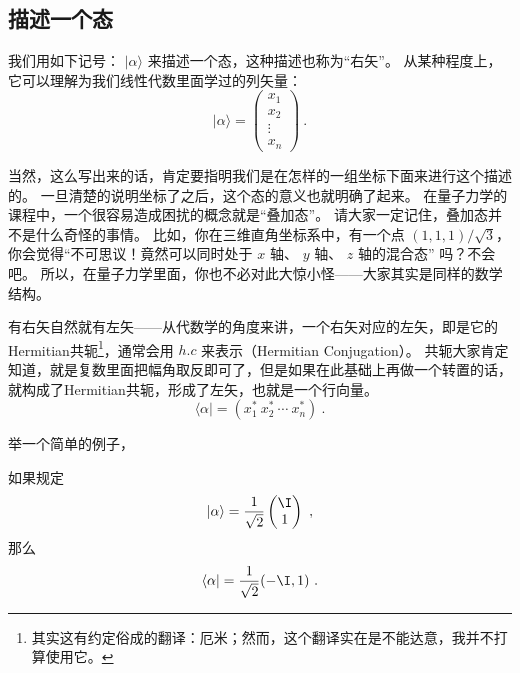 
\subsection{描述一个态}

我们用如下记号： $|\alpha\rangle$ 来描述一个态，这种描述也称为“右矢”。 从某种程度上，它可以理解为我们线性代数里面学过的列矢量：
\begin{equation}
|\alpha\rangle = \left(\begin{matrix}x_1\\x_2\\ \vdots\\ x_n\end{matrix}\right)~.
\end{equation}

当然，这么写出来的话，肯定要指明我们是在怎样的一组坐标下面来进行这个描述的。 一旦清楚的说明坐标了之后，这个态的意义也就明确了起来。 在量子力学的课程中，一个很容易造成困扰的概念就是“叠加态”。 请大家一定记住，叠加态并不是什么奇怪的事情。 比如，你在三维直角坐标系中，有一个点 $(1, 1, 1)/\sqrt3$，你会觉得“不可思议！竟然可以同时处于 $x$ 轴、 $y$ 轴、 $z$ 轴的混合态” 吗？不会吧。 所以，在量子力学里面，你也不必对此大惊小怪——大家其实是同样的数学结构。

有右矢自然就有左矢——从代数学的角度来讲，一个右矢对应的左矢，即是它的Hermitian共轭\footnote{其实这有约定俗成的翻译：厄米；然而，这个翻译实在是不能达意，我并不打算使用它。}，通常会用 $h. c$ 来表示（Hermitian Conjugation）。 共轭大家肯定知道，就是复数里面把幅角取反即可了，但是如果在此基础上再做一个转置的话，就构成了Hermitian共轭，形成了左矢，也就是一个行向量。
\begin{equation}
\langle\alpha| = (x_1^*\ x_2^*\ \cdots\ x_n^*)~.
\end{equation}

举一个简单的例子，

\begin{example}{}
如果规定
\begin{equation}
|\alpha\rangle = \frac{1}{\sqrt{2}}\left(\begin{matrix}\I \\1\end{matrix}\right) ~,
\end{equation}
那么
\begin{equation}
\langle\alpha| = \frac{1}{\sqrt{2}}(-\I, 1)~.
\end{equation}
\end{example}

